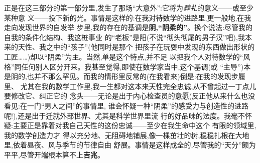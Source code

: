 正是在这三部分的第一部分里,发生了那场“大意外”:它将为\emph{葬礼}的意义——或至少某种意
义——投下新的光。事情是这样的:在我对待数学的进路里,更一般地,在我走向发现世界的自发举
步里,我的存在的基调是\textbf{阴,“阴柔的”}。换个说法:尽管我的自我的条件化结构、我这桩事业
的“老板”是阳(不说“彻头彻尾的男子汉”吧),我本来的天性、我之中的“孩子”(他同时是那个
把孩子在玩耍中发现的东西做出形状的工匠……)却以“阴柔”为主。当然,单是这个特点,并不足
以把我个人对待数学的“风格”同任何别人区分开来。我甚至觉得,即使在数学家当中,这个基调(或
“主导”)本是阴的,也并不那么罕见。而我的情形里反常的(在我看来)倒是:在我的发现步履里、
尤其在我的数学工作里,我一生都对这本来天性完全忠诚,从不曾起过一丁点儿要修改它、纠正它的
念头——无论是出于内心检查员的意愿(反正他从来什么也没看见:在一门“男人之间”的事情里,
谁会怀疑一种“阴柔”的感受力与创造性的进路呢!),还是出于迁就外部世界、尤其是科学世界里流
行的好品味的法度。我毫不怀疑:主要正是靠着对我自己天性的这份忠诚——至少在我生命中这个
有限的领域里,我的数学创造力才
得以充分地、无阻碍地铺展,像一棵茁壮的树,稳稳扎根在大地里,依着昼夜、风与季节的节律自由
舒展。事情是这样成全的,尽管我的“天分”颇为平平,尽管开端根本算不上\dmark{}\textbf{吉兆}。

